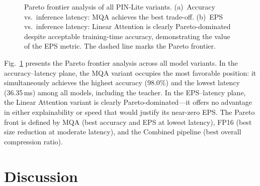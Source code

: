\documentclass[lettersize,journal]{IEEEtran}
\begin{document}
\begin{figure}[!t]
\centering
\caption{Pareto frontier analysis of all PIN-Lite variants. (a)~Accuracy vs.\ inference latency: MQA achieves the best trade-off. (b)~EPS vs.\ inference latency: Linear Attention is clearly Pareto-dominated despite acceptable training-time accuracy, demonstrating the value of the EPS metric. The dashed line marks the Pareto frontier.}
\label{fig:pareto}
\end{figure}

Fig.~\ref{fig:pareto} presents the Pareto frontier analysis across all model variants. In the accuracy--latency plane, the MQA variant occupies the most favorable position: it simultaneously achieves the highest accuracy (98.0\%) and the lowest latency (36.35\,ms) among all models, including the teacher. In the EPS--latency plane, the Linear Attention variant is clearly Pareto-dominated---it offers no advantage in either explainability or speed that would justify its near-zero EPS. The Pareto front is defined by MQA (best accuracy and EPS at lowest latency), FP16 (best size reduction at moderate latency), and the Combined pipeline (best overall compression ratio).


\section{Discussion}
\label{sec:discussion}
\end{document}
